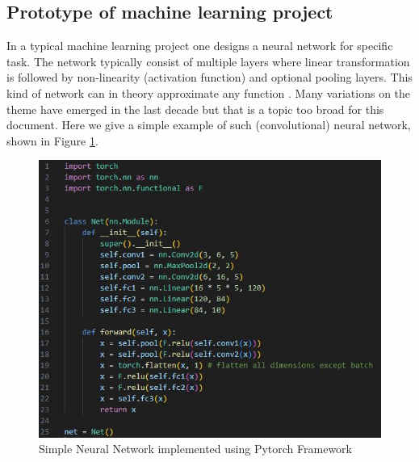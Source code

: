 \documentclass{article}
\begin{document}
\subsection{Prototype of machine learning project}
In a typical machine learning project one designs a neural network for specific task.
The network typically consist of multiple layers where linear transformation is followed by
non-linearity (activation function) and optional pooling layers.
This kind of network can in theory approximate any function \cite{Hornik1989}.
Many variations on the theme have emerged in the last decade but that is a topic too broad for this document.
Here we give a simple example of such (convolutional) neural network, shown in Figure \ref{fig:neural_network}.

\begin{figure}[t!]
    \centering
    \includegraphics[width=12cm]{net.JPG}
    \caption{Simple Neural Network implemented using Pytorch Framework}
    \label{fig:neural_network}
\end{figure}
\end{document}
